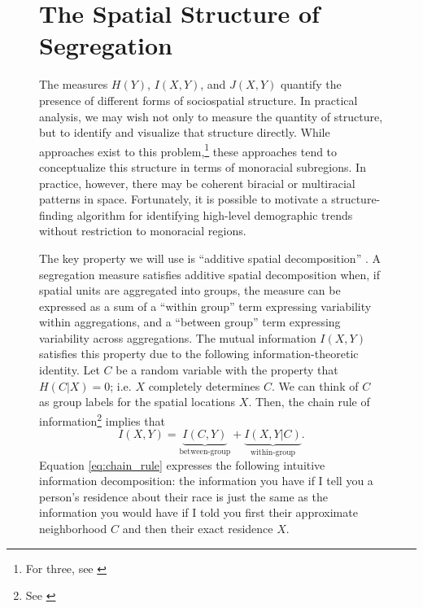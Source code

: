 \documentclass[english]{scrartcl}
\begin{document}
\begin{figure}
		


\section{The Spatial Structure of Segregation} \label{sec:id}
	

	The measures $H(Y)$, $I(X,Y)$, and $J(X,Y)$ quantify the presence of different forms of sociospatial structure. In practical analysis, we may wish not only to measure the quantity of structure, but to identify and visualize that structure directly. While approaches exist to this problem,\footnote{For three, see \cite{Logan2011}} these approaches tend to conceptualize this structure in terms of monoracial subregions. In practice, however, there may be coherent biracial or multiracial patterns in space. Fortunately, it is possible to motivate a structure-finding algorithm for identifying high-level demographic trends without restriction to monoracial regions. 

	The key property we will use is ``additive spatial decomposition'' \cite{Reardon2004}. A segregation measure satisfies additive spatial decomposition when, if spatial units are aggregated into groups, the measure can be expressed as a sum of a ``within group'' term expressing variability within aggregations, and a ``between group'' term expressing variability across aggregations. The mutual information $I(X,Y)$ satisfies this property due to the following information-theoretic identity. Let $C$ be a random variable with the property that $H(C|X) = 0$; i.e. $X$ completely determines $C$. We can think of $C$ as group labels for the spatial locations $X$. Then, the chain rule of information\footnote{See \cite{Cover1991}} implies that 
	\begin{equation}
		I(X,Y) = \underbrace{I(C,Y)}_{\text{between-group}} + \underbrace{I(X,Y|C)}_{\text{within-group}}. \label{eq:chain_rule}
	\end{equation}
	Equation \eqref{eq:chain_rule} expresses the following intuitive information decomposition: the information you have if I tell you a person's residence about their race is just the same as the information you would have if I told you first their approximate neighborhood $C$ and then their exact residence $X$. 


\end{figure}
\end{document}
